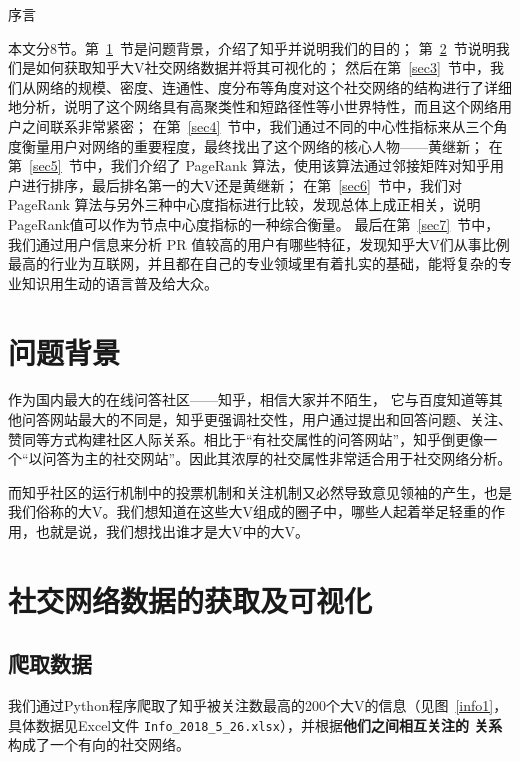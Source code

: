 \documentclass[a4paper]{article}
\begin{document}
\newpage
\begin{spacing}{1.5}
\thispagestyle{empty}
\tableofcontents
\setcounter{page}{1}
\thispagestyle{empty}


\newpage
\setcounter{page}{1}
\begin{spacing}{2.25}
\begin{center}
{\heiti  {} 序言}
\end{center}
\end{spacing}
本文分8节。第~\ref{sec1}~节是问题背景，介绍了知乎并说明我们的目的；
第~\ref{sec2}~节说明我们是如何获取知乎大V社交网络数据并将其可视化的；
然后在第~\ref{sec3}~节中，我们从网络的规模、密度、连通性、度分布等角度对这个社交网络的结构进行了详细地分析，说明了这个网络具有高聚类性和短路径性等小世界特性，而且这个网络用
户之间联系非常紧密；
在第~\ref{sec4}~节中，我们通过不同的中心性指标来从三个角度衡量用户对网络的重要程度，最终找出了这个网络的核心人物——黄继新；
在第~\ref{sec5}~节中，我们介绍了 PageRank 算法，使用该算法通过邻接矩阵对知乎用户进行排序，最后排名第一的大V还是黄继新；
在第~\ref{sec6}~节中，我们对PageRank 算法与另外三种中心度指标进行比较，发现总体上成正相关，说明PageRank值可以作为节点中心度指标的一种综合衡量。
最后在第~\ref{sec7}~节中，我们通过用户信息来分析 PR 值较高的用户有哪些特征，发现知乎大V们从事比例最高的行业为互联网，并且都在自己的专业领域里有着扎实的基础，能将复杂的专业知识用生动的语言普及给大众。
\section{问题背景}\label{sec1}
作为国内最大的在线问答社区——知乎，相信大家并不陌生，
它与百度知道等其他问答网站最大的不同是，知乎更强调社交性，用户通过提出和回答问题、关注、赞同等方式构建社区人际关系。相比于“有社交属性的问答网站”，知乎倒更像一个“以问答为主的社交网站”。因此其浓厚的社交属性非常适合用于社交网络分析。

而知乎社区的运行机制中的投票机制和关注机制又必然导致意见领袖的产生，也是我们俗称的大V。我们想知道在这些大V组成的圈子中，哪些人起着举足轻重的作用，也就是说，我们想找出谁才是大V中的大V。

\section{社交网络数据的获取及可视化}\label{sec2}
\subsection{爬取数据}
我们通过Python程序爬取了知乎被关注数最高的200个大V的信息（见图~\ref{info1}，具体数据见Excel文件 \verb"Info_2018_5_26.xlsx"），并根据\textbf{他们之间相互关注的
关系}构成了一个有向的社交网络。


\end{spacing}
\end{document}
